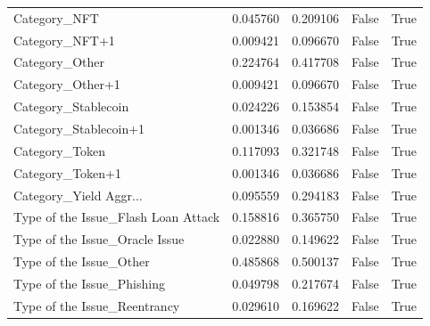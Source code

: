 \begin{tabular}{lllll}
Category\_NFT & 0.045760 & 0.209106 & False & True \\
Category\_NFT+1 & 0.009421 & 0.096670 & False & True \\
Category\_Other & 0.224764 & 0.417708 & False & True \\
Category\_Other+1 & 0.009421 & 0.096670 & False & True \\
Category\_Stablecoin & 0.024226 & 0.153854 & False & True \\
Category\_Stablecoin+1 & 0.001346 & 0.036686 & False & True \\
Category\_Token & 0.117093 & 0.321748 & False & True \\
Category\_Token+1 & 0.001346 & 0.036686 & False & True \\
Category\_Yield Aggr... & 0.095559 & 0.294183 & False & True \\
Type of the Issue\_Flash Loan Attack & 0.158816 & 0.365750 & False & True \\
Type of the Issue\_Oracle Issue & 0.022880 & 0.149622 & False & True \\
Type of the Issue\_Other & 0.485868 & 0.500137 & False & True \\
Type of the Issue\_Phishing & 0.049798 & 0.217674 & False & True \\
Type of the Issue\_Reentrancy & 0.029610 & 0.169622 & False & True \\
\bottomrule
\end{tabular}
